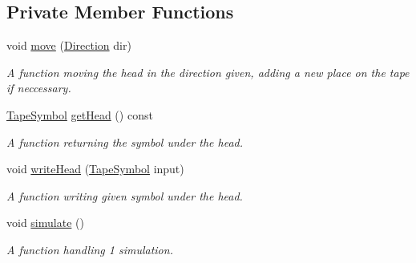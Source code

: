 \subsection*{\-Private \-Member \-Functions}
\begin{DoxyCompactItemize}
\item 
void \hyperlink{classTM_1_1TuringMachine_a0aa707581497a4a7a0da06eb2ed867be}{move} (\hyperlink{namespaceTM_a7c40dddb5b66504639e0d378ec13792d}{\-Direction} dir)
\begin{DoxyCompactList}\small\item\em \-A function moving the head in the direction given, adding a new place on the tape if neccessary. \end{DoxyCompactList}\item 
\hyperlink{namespaceTM_af53c0529f78dfcdeb19c450abbd44cf6}{\-Tape\-Symbol} \hyperlink{classTM_1_1TuringMachine_aa3a5267e700842786eeb59fa96a3007f}{get\-Head} () const 
\begin{DoxyCompactList}\small\item\em \-A function returning the symbol under the head. \end{DoxyCompactList}\item 
void \hyperlink{classTM_1_1TuringMachine_a63ec43241d2c34c3c19de91cdac7a2b6}{write\-Head} (\hyperlink{namespaceTM_af53c0529f78dfcdeb19c450abbd44cf6}{\-Tape\-Symbol} input)
\begin{DoxyCompactList}\small\item\em \-A function writing given symbol under the head. \end{DoxyCompactList}\item 
void \hyperlink{classTM_1_1TuringMachine_a37e46074a566b631bd71c24795872c50}{simulate} ()
\begin{DoxyCompactList}\small\item\em \-A function handling 1 simulation. \end{DoxyCompactList}\end{DoxyCompactItemize}
